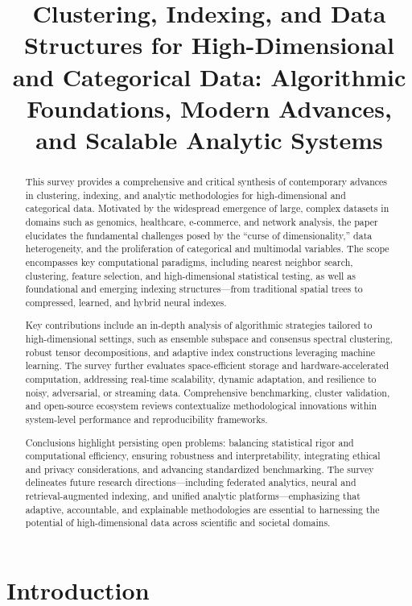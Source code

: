 \documentclass[sigconf]{acmart}
\title{Clustering, Indexing, and Data Structures for High-Dimensional and Categorical Data: Algorithmic Foundations, Modern Advances, and Scalable Analytic Systems}
\begin{document}
\begin{abstract}
This survey provides a comprehensive and critical synthesis of contemporary advances in clustering, indexing, and analytic methodologies for high-dimensional and categorical data. Motivated by the widespread emergence of large, complex datasets in domains such as genomics, healthcare, e-commerce, and network analysis, the paper elucidates the fundamental challenges posed by the “curse of dimensionality,” data heterogeneity, and the proliferation of categorical and multimodal variables. The scope encompasses key computational paradigms, including nearest neighbor search, clustering, feature selection, and high-dimensional statistical testing, as well as foundational and emerging indexing structures—from traditional spatial trees to compressed, learned, and hybrid neural indexes.

Key contributions include an in-depth analysis of algorithmic strategies tailored to high-dimensional settings, such as ensemble subspace and consensus spectral clustering, robust tensor decompositions, and adaptive index constructions leveraging machine learning. The survey further evaluates space-efficient storage and hardware-accelerated computation, addressing real-time scalability, dynamic adaptation, and resilience to noisy, adversarial, or streaming data. Comprehensive benchmarking, cluster validation, and open-source ecosystem reviews contextualize methodological innovations within system-level performance and reproducibility frameworks.

Conclusions highlight persisting open problems: balancing statistical rigor and computational efficiency, ensuring robustness and interpretability, integrating ethical and privacy considerations, and advancing standardized benchmarking. The survey delineates future research directions—including federated analytics, neural and retrieval-augmented indexing, and unified analytic platforms—emphasizing that adaptive, accountable, and explainable methodologies are essential to harnessing the potential of high-dimensional data across scientific and societal domains.
\end{abstract}

\maketitle

\section{Introduction}
\end{document}
